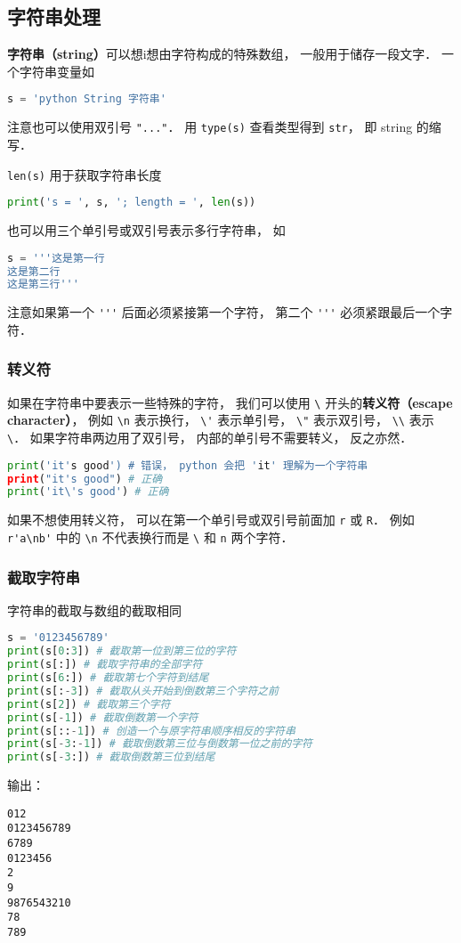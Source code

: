 

\subsection{字符串处理}
\textbf{字符串（string）}可以想i想由字符构成的特殊数组， 一般用于储存一段文字． 一个字符串变量如
\begin{lstlisting}[language=python]
s = 'python String 字符串'
\end{lstlisting}
注意也可以使用双引号 \verb|"..."|． 用 \verb|type(s)| 查看类型得到 \verb|str|， 即 string 的缩写．

\verb|len(s)| 用于获取字符串长度
\begin{lstlisting}[language=python]
print('s = ', s, '; length = ', len(s))
\end{lstlisting}
也可以用三个单引号或双引号表示多行字符串， 如
\begin{lstlisting}[language=python]
s = '''这是第一行
这是第二行
这是第三行'''
\end{lstlisting}
注意如果第一个 \verb|'''| 后面必须紧接第一个字符， 第二个 \verb|'''| 必须紧跟最后一个字符．

\subsubsection{转义符}
如果在字符串中要表示一些特殊的字符， 我们可以使用 \verb|\| 开头的\textbf{转义符（escape character）}， 例如 \verb|\n| 表示换行， \verb|\'| 表示单引号， \verb|\"| 表示双引号， \verb|\\| 表示 \verb|\|． 如果字符串两边用了双引号， 内部的单引号不需要转义， 反之亦然．
\begin{lstlisting}[language=python]
print('it's good') # 错误， python 会把 'it' 理解为一个字符串
print("it's good") # 正确
print('it\'s good') # 正确
\end{lstlisting}

如果不想使用转义符， 可以在第一个单引号或双引号前面加 \verb|r| 或 \verb|R|． 例如 \verb|r'a\nb'| 中的 \verb|\n| 不代表换行而是 \verb|\| 和 \verb|n| 两个字符．

\subsubsection{截取字符串}
字符串的截取与数组的截取相同
\begin{lstlisting}[language=python]
s = '0123456789'
print(s[0:3]) # 截取第一位到第三位的字符
print(s[:]) # 截取字符串的全部字符
print(s[6:]) # 截取第七个字符到结尾
print(s[:-3]) # 截取从头开始到倒数第三个字符之前
print(s[2]) # 截取第三个字符
print(s[-1]) # 截取倒数第一个字符
print(s[::-1]) # 创造一个与原字符串顺序相反的字符串
print(s[-3:-1]) # 截取倒数第三位与倒数第一位之前的字符
print(s[-3:]) # 截取倒数第三位到结尾
\end{lstlisting}
输出：
\begin{lstlisting}
012
0123456789
6789
0123456
2
9
9876543210
78
789
\end{lstlisting}


